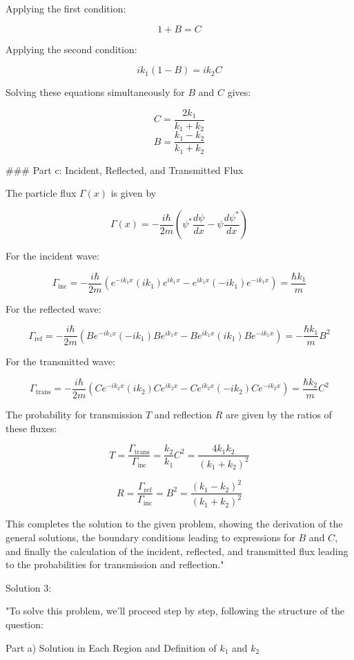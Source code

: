 Applying the first condition:

\[
1 + B = C
\]

Applying the second condition:

\[
ik_1(1 - B) = ik_2C
\]

Solving these equations simultaneously for \(B\) and \(C\) gives:

\[
C = \frac{2k_1}{k_1+k_2}
\]
\[
B = \frac{k_1-k_2}{k_1+k_2}
\]

### Part c: Incident, Reflected, and Transmitted Flux

The particle flux \(\Gamma(x)\) is given by

\[
\Gamma(x) = -\frac{i\hbar}{2m} \left(\psi^{*}\frac{d\psi}{dx} - \psi\frac{d\psi^{*}}{dx} \right)
\]

For the incident wave:

\[
\Gamma_{\text{inc}} = -\frac{i\hbar}{2m} \left(e^{-ik_1x}(ik_1)e^{ik_1x} - e^{ik_1x}(-ik_1)e^{-ik_1x}\right) = \frac{\hbar k_1}{m}
\]

For the reflected wave:

\[
\Gamma_{\text{ref}} = -\frac{i\hbar}{2m} \left(Be^{-ik_1x}(-ik_1)Be^{ik_1x} - Be^{ik_1x}(ik_1)Be^{-ik_1x}\right) = -\frac{\hbar k_1}{m}B^2
\]

For the transmitted wave:

\[
\Gamma_{\text{trans}} = -\frac{i\hbar}{2m} \left(Ce^{-ik_2x}(ik_2)Ce^{ik_2x} - Ce^{ik_2x}(-ik_2)Ce^{-ik_2x}\right) = \frac{\hbar k_2}{m}C^2
\]

The probability for transmission \(T\) and reflection \(R\) are given by the ratios of these fluxes:

\[
T = \frac{\Gamma_{\text{trans}}}{\Gamma_{\text{inc}}} = \frac{k_2}{k_1}C^2 = \frac{4k_1k_2}{(k_1+k_2)^2}
\]

\[
R = \frac{\Gamma_{\text{ref}}}{\Gamma_{\text{inc}}} = B^2 = \frac{(k_1-k_2)^2}{(k_1+k_2)^2}
\]

This completes the solution to the given problem, showing the derivation of the general solutions, the boundary conditions leading to expressions for \(B\) and \(C\), and finally the calculation of the incident, reflected, and transmitted flux leading to the probabilities for transmission and reflection."

Solution 3:

"To solve this problem, we'll proceed step by step, following the structure of the question:

Part a) Solution in Each Region and Definition of \(k_1\) and \(k_2\)

